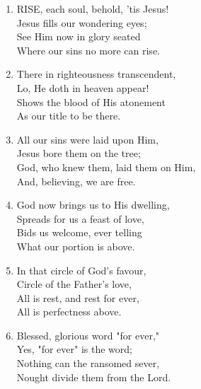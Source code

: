 \begin{enumerate}
    \item RISE, each soul, behold, 'tis Jesus! \\
        Jesus fills our wondering eyes; \\
        See Him now in glory seated \\
        Where our sins no more can rise.

    \item There in righteousness transcendent, \\
        Lo, He doth in heaven appear! \\
        Shows the blood of His atonement \\
        As our title to be there.

    \item All our sins were laid upon Him, \\
        Jesus bore them on the tree; \\
        God, who knew them, laid them on Him, \\
        And, believing, we are free.

    \item God now brings us to His dwelling, \\
        Spreads for us a feast of love, \\
        Bids us welcome, ever telling \\
        What our portion is above.

    \item In that circle of God's favour, \\
        Circle of the Father's love, \\
        All is rest, and rest for ever, \\
        All is perfectness above.

    \item Blessed, glorious word "for ever," \\
        Yes, "for ever" is the word; \\
        Nothing can the ransomed sever, \\
        Nought divide them from the Lord.

\end{enumerate}
